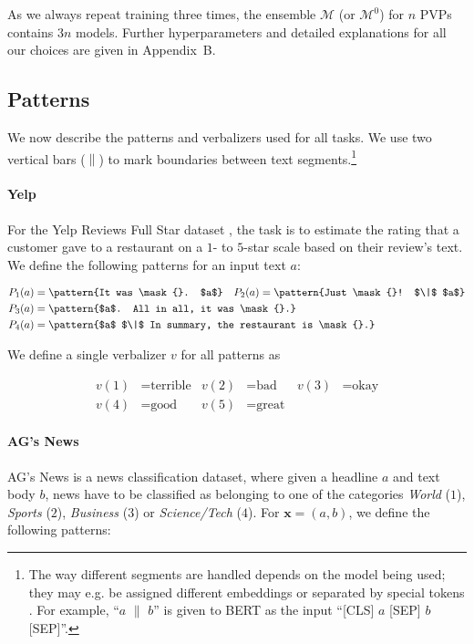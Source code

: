As we always repeat training three times, the ensemble $\mathcal{M}$ (or $\mathcal{M}^0$) for $n$ PVPs contains $3n$ models. Further hyperparameters and detailed explanations for all our choices are given in Appendix~B.

\subsection{Patterns}
\label{patterns}

We now describe the patterns and verbalizers used for all tasks. We use two vertical bars ($\|$) to mark boundaries between  text segments.\footnote{The way different segments are handled depends on the model being used; they may e.g. be assigned different embeddings \citep{devlin2018bert} or separated by special tokens \citep{liu2019roberta,yang2019xlnet}. For example, ``{$a$ $\|$ $b$}'' is given to BERT as the input ``[CLS] $a$ [SEP] $b$ [SEP]''.}

\paragraph{Yelp}

For the Yelp Reviews Full Star dataset \citep{zhang2015character}, the task is to estimate the rating that a customer gave to a restaurant on a $1$- to $5$-star scale based on their review's text. We define the following patterns for an input text $a$:

\begin{align*}
P_1(a) & = \pattern{It was \mask{}. $a$} & P_2(a) & = \pattern{Just \mask{}! $\|$ $a$} \\
P_3(a) & = \rlap{\pattern{$a$. All in all, it was \mask{}.}}\\
P_4(a) & = \rlap{\pattern{$a$ $\|$ In summary, the restaurant is \mask{}.}}
\end{align*}

We define a single verbalizer $v$ for all patterns as

\begin{align*}
v(1) & = \text{terrible} & v(2) & = \text{bad} & v(3) & = \text{okay} \\
v(4) & = \text{good} & v(5) & = \text{great}\,
\end{align*}

\paragraph{AG's News}

AG's News is a news classification dataset, where given a headline $a$ and text body $b$, news have to be classified as belonging to one of the categories \emph{World} ($1$), \emph{Sports} ($2$), \emph{Business} ($3$) or \emph{Science/Tech} ($4$). For $\mathbf{x} = (a,b)$, we define the following patterns:

